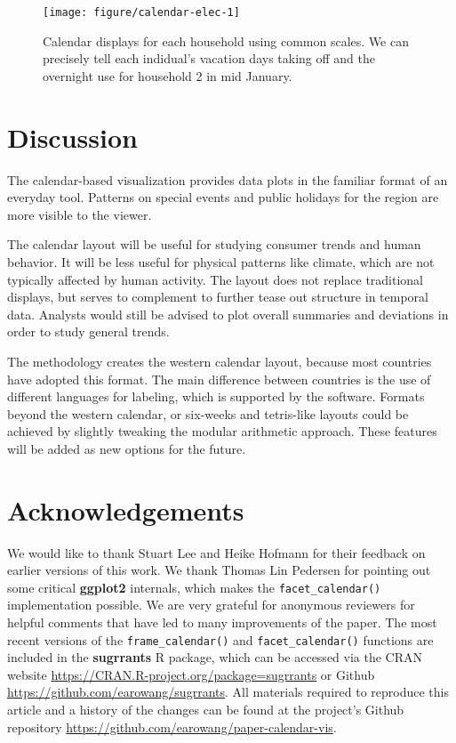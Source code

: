 \documentclass[12pt]{article}
\begin{document}
\begin{figure}

{\centering \texttt{[image: figure/calendar-elec-1]} 

}

\caption{Calendar displays for each household using common scales. We can precisely tell each indidual's vacation days taking off and the overnight use for household 2 in mid January.}\label{fig:calendar-elec}
\end{figure}

\hypertarget{sec:discussion}{%
\section{Discussion}\label{sec:discussion}}

The calendar-based visualization provides data plots in the familiar format of an everyday tool. Patterns on special events and public holidays for the region are more visible to the viewer.

The calendar layout will be useful for studying consumer trends and human behavior. It will be less useful for physical patterns like climate, which are not typically affected by human activity. The layout does not replace traditional displays, but serves to complement to further tease out structure in temporal data. Analysts would still be advised to plot overall summaries and deviations in order to study general trends.

The methodology creates the western calendar layout, because most countries have adopted this format. The main difference between countries is the use of different languages for labeling, which is supported by the software. Formats beyond the western calendar, or six-weeks and tetris-like layouts could be achieved by slightly tweaking the modular arithmetic approach. These features will be added as new options for the future.

\hypertarget{acknowledgements}{%
\section*{Acknowledgements}\label{acknowledgements}}

We would like to thank Stuart Lee and Heike Hofmann for their feedback on earlier versions of this work. We thank Thomas Lin Pedersen for pointing out some critical \textbf{ggplot2} internals, which makes the \texttt{facet\_calendar()} implementation possible. We are very grateful for anonymous reviewers for helpful comments that have led to many improvements of the paper. The most recent versions of the \texttt{frame\_calendar()} and \texttt{facet\_calendar()} functions are included in the \textbf{sugrrants} R package, which can be accessed via the CRAN website \url{https://CRAN.R-project.org/package=sugrrants} or Github \url{https://github.com/earowang/sugrrants}. All materials required to reproduce this article and a history of the changes can be found at the project's Github repository \url{https://github.com/earowang/paper-calendar-vis}.



\end{document}
